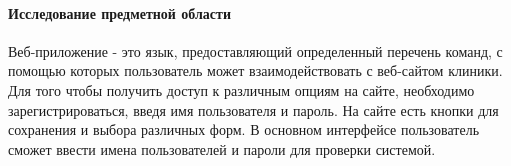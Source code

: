 \paragraph{Исследование предметной области}

Веб-приложение - это язык, предоставляющий определенный перечень команд, с помощью которых пользователь может взаимодействовать с веб-сайтом клиники. 
Для того чтобы получить доступ к различным опциям на сайте, необходимо зарегистрироваться, введя имя пользователя и пароль.
На сайте есть кнопки для сохранения и выбора различных форм.
В основном интерфейсе пользователь сможет ввести имена пользователей и пароли для проверки системой.